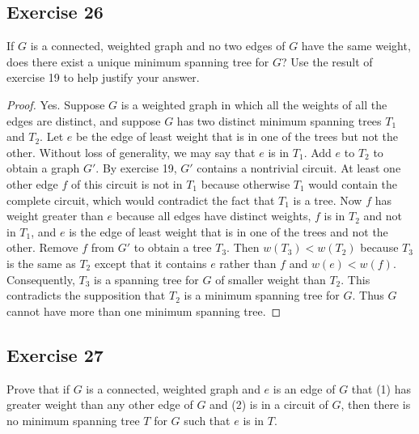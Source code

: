 \documentclass[14pt]{extarticle}
\begin{document}
\subsection{Exercise 26}
If \(G\) is a connected, weighted graph and no two edges of \(G\) have the same weight, does there exist a unique minimum 
spanning tree for \(G\)? Use the result of exercise 19 to help justify your answer.

\begin{proof}
Yes. Suppose \(G\) is a weighted graph in which all the weights of all the edges are distinct, and suppose \(G\) has 
two distinct minimum spanning trees \(T_1\) and \(T_2\). Let \(e\) be the edge of least weight that is in one of the trees 
but not the other. Without loss of generality, we may say that \(e\) is in \(T_1\). Add \(e\) to \(T_2\) to obtain a graph 
\(G'\). By exercise 19, \(G'\) contains a nontrivial circuit. At least one other edge \(f\) of this circuit is not in 
\(T_1\) because otherwise \(T_1\) would contain the complete circuit, which would contradict the fact that \(T_1\) is a 
tree. Now \(f\) has weight greater than \(e\) because all edges have distinct weights, \(f\) is in \(T_2\) and not in 
\(T_1\), and \(e\) is the edge of least weight that is in one of the trees and not the other. Remove \(f\) from \(G'\) to 
obtain a tree \(T_3\). Then \(w(T_3) < w(T_2)\) because \(T_3\) is the same as \(T_2\) except that it contains \(e\) 
rather than \(f\) and \(w(e) < w(f)\). Consequently, \(T_3\) is a spanning tree for \(G\) of smaller weight than \(T_2\). 
This contradicts the supposition that \(T_2\) is a minimum spanning tree for \(G\). Thus \(G\) cannot have more than one 
minimum spanning tree.
\end{proof}

\subsection{Exercise 27}
Prove that if \(G\) is a connected, weighted graph and \(e\) is an edge of \(G\) that (1) has greater weight than any other 
edge of \(G\) and (2) is in a circuit of \(G\), then there is no minimum spanning tree \(T\) for \(G\) such that 
\(e\) is in \(T\).
\end{document}
